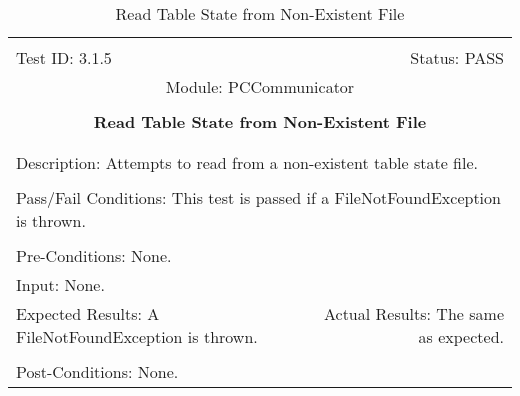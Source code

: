 \documentclass[titlepage]{article}
\begin{document}
\begin{center}
\begin{table}[h!]
\begin{tabular}{|l r|}\hline&\\[-2mm]
	Test ID: 3.1.5	&Status: PASS\\[-3mm]
	\multicolumn{2}{|c|}{Module: PCCommunicator}\\&\\
	\multicolumn{2}{|c|}{\textbf{\large{Read Table State from Non-Existent File}}}\\&\\\hline&\\[-3mm]
	\multicolumn{2}{|p{\textwidth}|}{Description: Attempts to read from a non-existent table state file.}\\[1mm]\hline&\\[-3mm]
	\multicolumn{2}{|p{\textwidth}|}{Pass/Fail Conditions: This test is passed if a FileNotFoundException is thrown.}\\[1mm]\hline&\\[-3mm]
	\multicolumn{2}{|p{\textwidth}|}{Pre-Conditions: None.}\\[4mm]
	\multicolumn{2}{|p{\textwidth}|}{Input: None.}\\[2mm]\hline
	\multicolumn{1}{|p{0.49\textwidth}}{Expected Results: A FileNotFoundException is thrown.}	&\multicolumn{1}{|p{0.45\textwidth}|}{Actual Results: The same as expected.}\\\hline&\\[-3mm]
	\multicolumn{2}{|p{\textwidth}|}{Post-Conditions: None.}\\\hline
\end{tabular}
\caption{Read Table State from Non-Existent File}
\end{table}
\end{center}
\newpage
\end{document}
